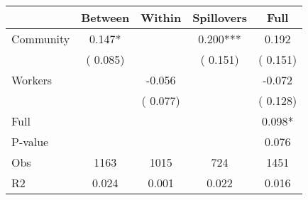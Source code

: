 
\begin{tabular}{l*{4}{c}}\hline&\multicolumn{1}{c}{Between}&\multicolumn{1}{c}{Within}&\multicolumn{1}{c}{Spillovers}&\multicolumn{1}{c}{Full}\\ \hline
 Community             &              0.147*      &                                               &        0.200*** &         0.192                            \\ 
                               &        (       0.085)           &                                       &       (       0.151)     &      (       0.151)                                           \\ 
 Workers       &                                               &       -0.056    &                                &            -0.072                            \\ 
                               &                                               & (       0.077)                  &                                        &      (       0.128)                                           \\ 
\hline                                                                                                                                                                                                                                            
 Full                  &                                               &                                               &                                        &             0.098*                                     \\ 
 P-value               &                                               &                                               &                                        &             0.076                                           \\ 
 Obs                   &               1163               &       1015                       &       724                &              1451                                               \\ 
 R2                    &                      0.024              &              0.001                      &              0.022               &                     0.016                                              \\ 
\hline \end{tabular}                                                                                                                                                                                                              